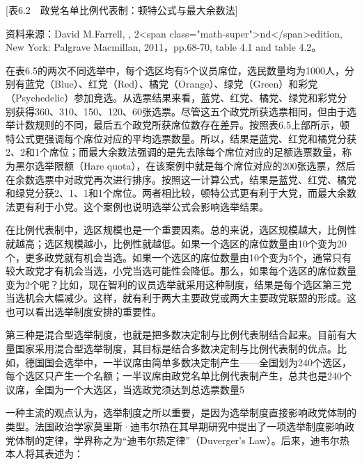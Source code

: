 [表6.2　政党名单比例代表制：顿特公式与最大余数法]

资料来源：David M.Farrell, , 2<span class="math-super">nd</span>edition, New York: Palgrave Macmillan, 2011，pp.68-70, table 4.1 and table 4.2。

在表6.5的两次不同选举中，每个选区均有5个议员席位，选民数量均为1000人，分别有蓝党（Blue）、红党（Red）、橘党（Orange）、绿党（Green）和彩党（Psychedelic）参加竞选。从选票结果来看，蓝党、红党、橘党、绿党和彩党分别获得360、310、150、120、60张选票。尽管这五个政党所获选票相同，但由于选举计数规则的不同，最后五个政党所获席位数存在差异。按照表6.5上部所示，顿特公式更强调每个席位对应的平均选票数量。所以，结果是蓝党、红党和橘党分获2、2和1个席位；而最大余数法强调的是先去除每个席位对应的足额选票数量，称为黑尔选举限额（Hare quota），在该案例中就是每个席位对应的200张选票，然后在余数选票中对政党再次进行排序。按照这一计算公式，结果是蓝党、红党、橘党和绿党分获2、1、1和1个席位。两者相比较，顿特公式更有利于大党，而最大余数法更有利于小党。这个案例也说明选举公式会影响选举结果。

在比例代表制中，选区规模也是一个重要因素。总的来说，选区规模越大，比例性就越高；选区规模越小，比例性就越低。如果一个选区的席位数量由10个变为20个，更多政党就有机会当选。如果一个选区的席位数量由10个变为5个，通常只有较大政党才有机会当选，小党当选可能性会降低。那么，如果每个选区的席位数量变为2个呢？比如，现在智利的议员选举就采用这种制度，结果是每个选区第三党当选机会大幅减少。这样，就有利于两大主要政党或两大主要政党联盟的形成。这也可以看出选举制度安排的重要性。

第三种是混合型选举制度，也就是把多数决定制与比例代表制结合起来。目前有大量国家采用混合型选举制度，其目标是结合多数决定制与比例代表制的优点。比如，德国国会选举中，一半议席由简单多数决定制产生——全国划为240个选区，每个选区只产生一个名额；一半议席由政党名单比例代表制产生，总共也是240个议席，全国为一个大选区，当选政党须达到总选票数量5%

一种主流的观点认为，选举制度之所以重要，是因为选举制度直接影响政党体制的类型。法国政治学家莫里斯·迪韦尔热在其早期研究中提出了一项选举制度影响政党体制的定律，学界称之为“迪韦尔热定律”（Duverger's Law）。后来，迪韦尔热本人将其表述为：


